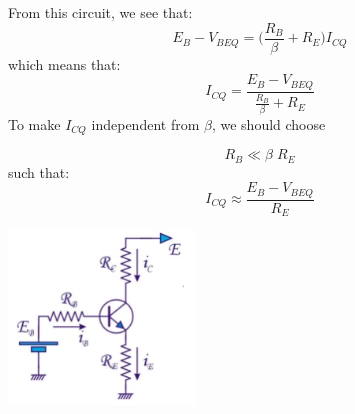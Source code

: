 \begin{minipage}{.6\textwidth}
	From this circuit, we see that:
	$$
	E_B - V_{BEQ} = \bigg( \frac{R_B}{\beta} + R_E \bigg) I_{CQ}
	$$
	which means that:
	$$
	I_{CQ} = \frac{E_B - V_{BEQ}}{\frac{R_B}{\beta} + R_E}
	$$
	To make $I_{CQ}$ independent from $\beta$, we should choose 
	
	
	\begin{equation}
		R_B \ll \beta \; R_E
		\label{eq:RB_condition}
	\end{equation}
	such that:
	\begin{equation}
		I_{CQ} \approx \frac{E_B-V_{BEQ}}{R_E}
		\label{eq:ICQ}
	\end{equation}
\end{minipage}
\begin{minipage}{.4\textwidth}
	\centering
	\includegraphics[width=5cm]{figures/ch02/general1b.jpg}
	\label{fig:biasing1}
\end{minipage}%

